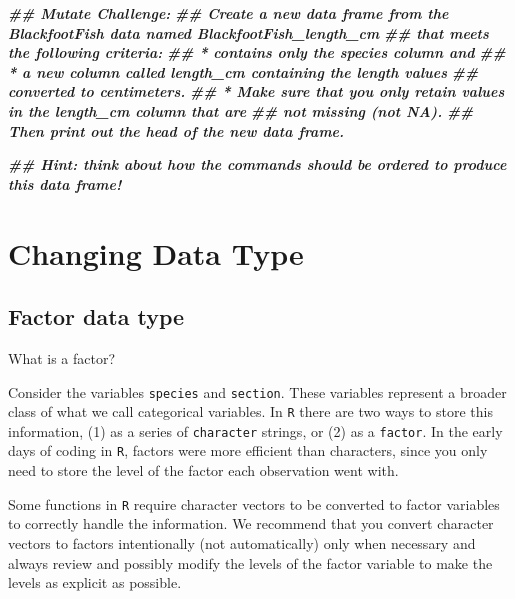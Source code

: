 \documentclass[
  10pt,
  letterpaper,
  twoside,
  openright]{book}
\newenvironment{Shaded}{\begin{snugshade}}{\end{snugshade}}
\newcommand{\DocumentationTok}[1]{\textcolor[rgb]{0.56,0.35,0.01}{\textbf{\textit{#1}}}}
\begin{document}
\begin{Shaded}
\begin{Highlighting}[]
\DocumentationTok{\#\# Mutate Challenge:}
\DocumentationTok{\#\#  Create a new data frame from the \textasciigrave{}BlackfootFish\textasciigrave{} data named \textasciigrave{}BlackfootFish\_length\_cm\textasciigrave{}}
\DocumentationTok{\#\#  that meets the following criteria: }
\DocumentationTok{\#\#  * contains only the \textasciigrave{}species\textasciigrave{} column and }
\DocumentationTok{\#\#  * a new column called \textasciigrave{}length\_cm\textasciigrave{} containing the \textasciigrave{}length\textasciigrave{} values }
\DocumentationTok{\#\#    converted to centimeters.}
\DocumentationTok{\#\#  * Make sure that you only retain values in the length\_cm column that are}
\DocumentationTok{\#\#    not missing (not NA).}
\DocumentationTok{\#\#  Then print out the head of the new data frame.}

\DocumentationTok{\#\#  Hint: think about how the commands should be ordered to produce this data frame!}
\end{Highlighting}
\end{Shaded}

\hypertarget{changing-data-type}{%
\section{Changing Data Type}\label{changing-data-type}}

\hypertarget{factor-data-type}{%
\subsection{Factor data type}\label{factor-data-type}}

What is a factor?

Consider the variables \texttt{species} and \texttt{section}. These
variables represent a broader class of what we call categorical
variables. In \texttt{R} there are two ways to store this information,
(1) as a series of \texttt{character} strings, or (2) as a
\texttt{factor}. In the early days of coding in \texttt{R}, factors were
more efficient than characters, since you only need to store the level
of the factor each observation went with.

Some functions in \texttt{R} require character vectors to be converted
to factor variables to correctly handle the information. We recommend
that you convert character vectors to factors intentionally (not
automatically) only when necessary and always review and possibly modify
the levels of the factor variable to make the levels as explicit as
possible.
\end{document}
